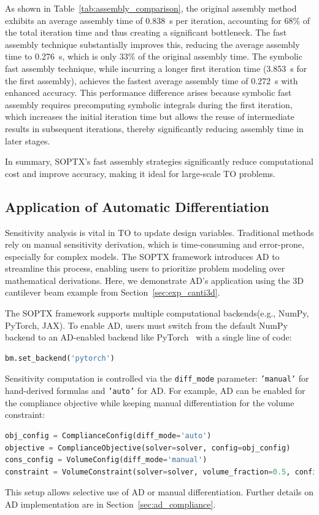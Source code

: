 \documentclass[mathpazo]{cicp}
\begin{document}
As shown in Table~\ref{tab:assembly_comparison}, the original assembly method exhibits an average assembly time of \SI{0.838}{s} per iteration, accounting for $68\%$ of the total iteration time and thus creating a significant bottleneck. The fast assembly technique substantially improves this, reducing the average assembly time to \SI{0.276}{s}, which is only $33\%$ of the original assembly time. The symbolic fast assembly technique, while incurring a longer first iteration time (\SI{3.853}{s} for the first assembly), achieves the fastest average assembly time of \SI{0.272}{s} with enhanced accuracy. This performance difference arises because symbolic fast assembly requires precomputing symbolic integrals during the first iteration, which increases the initial iteration time but allows the reuse of intermediate results in subsequent iterations, thereby significantly reducing assembly time in later stages.

In summary, SOPTX's fast assembly strategies significantly reduce computational cost and improve accuracy, making it ideal for large-scale TO problems.

\subsection{Application of Automatic Differentiation}\label{sec:exp_canti3d_ad}
Sensitivity analysis is vital in TO to update design variables. Traditional methods rely on manual sensitivity derivation, which is time-consuming and error-prone, especially for complex models. The SOPTX framework introduces AD to streamline this process, enabling users to prioritize problem modeling over mathematical derivations. Here, we demonstrate AD’s application using the 3D cantilever beam example from Section~\ref{sec:exp_canti3d}.

The SOPTX framework supports multiple computational backends(e.g., NumPy, PyTorch, JAX). To enable AD, users must switch from the default NumPy backend to an AD-enabled backend like PyTorch~\cite{paszke2017automatic} with a single line of code:
\begin{lstlisting}[language=python]
bm.set_backend('pytorch')
\end{lstlisting}

Sensitivity computation is controlled via the \texttt{diff\_mode} parameter: \texttt{'manual'} for hand-derived formulas and \texttt{'auto'} for AD. For example, AD can be enabled for the compliance objective while keeping manual differentiation for the volume constraint:
\begin{lstlisting}[language=python]
obj_config = ComplianceConfig(diff_mode='auto')
objective = ComplianceObjective(solver=solver, config=obj_config)
cons_config = VolumeConfig(diff_mode='manual')
constraint = VolumeConstraint(solver=solver, volume_fraction=0.5, config=cons_config)
\end{lstlisting}
This setup allows selective use of AD or manual differentiation. Further details on AD implementation are in Section~\ref{sec:ad_compliance}.
\end{document}
